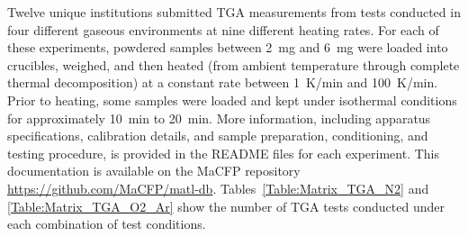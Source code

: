 \documentclass{book}
\begin{document}
Twelve unique institutions submitted TGA measurements from tests conducted in four different gaseous environments at nine different heating rates. For each of these experiments, powdered samples between 2~mg and 6~mg were loaded into crucibles, weighed, and then heated (from ambient temperature through complete thermal decomposition) at a constant rate between 1~K/min and 100~K/min. Prior to heating, some samples were loaded and kept under isothermal conditions for approximately 10~min to 20~min. More information, including  apparatus specifications, calibration details, and sample preparation, conditioning, and testing procedure, is provided in the README files for each experiment. This documentation is available on the MaCFP repository \href{https://github.com/MaCFP/matl-db}{https://github.com/MaCFP/matl-db}. Tables~\ref{Table:Matrix_TGA_N2} and \ref{Table:Matrix_TGA_O2_Ar} show the number of TGA tests conducted under each combination of test conditions.
\end{document}
